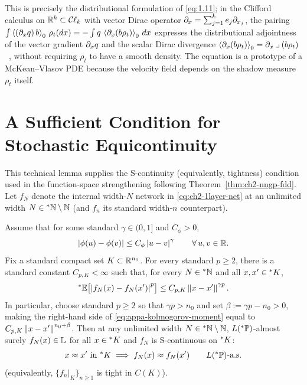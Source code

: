 This is precisely the distributional formulation of \eqref{eq:1.11}; in the Clifford calculus on $\mathbb{R}^k \subset \mathcal{C}\ell_k$ with vector Dirac operator $\partial_x = \sum_{j=1}^k e_j\partial_{x_j}$, the pairing $\int \left\langle (\partial_x q)\,b \right\rangle_0\,\rho_t(dx) = -\int q\,\left\langle \partial_x(b\rho_t) \right\rangle_0\,dx$ expresses the distributional adjointness of the vector gradient $\partial_x q$ and the scalar Dirac divergence $\left\langle \partial_x(b\rho_t) \right\rangle_0 = \partial_x \mathbin{\lrcorner} (b\rho_t)$~\cite{hestenes1984clifford,brackx1982clifford}, without requiring $\rho_t$ to have a smooth density. The equation is a prototype of a McKean--Vlasov PDE because the velocity field depends on the shadow measure $\rho_t$ itself.

\section{A Sufficient Condition for Stochastic Equicontinuity}
\label{sec:appa-equicontinuity}

This technical lemma supplies the S-continuity (equivalently, tightness) condition used in the function-space strengthening following Theorem~\ref{thm:ch2-nngp-fdd}.
Let $f_N$ denote the internal width-$N$ network in \eqref{eq:ch2-1layer-net} at an unlimited width $N \in {}^*\mathbb{N} \setminus \mathbb{N}$ (and $f_n$ its standard width-$n$ counterpart).

\begin{lemma}
\label{lem:holder-tightness}
Assume that for some standard $\gamma \in (0, 1]$ and $C_\phi > 0$,
\begin{equation}
\label{eq:appa-holder-act}
\left\lvert \phi(u) - \phi(v) \right\rvert \le C_\phi \left\lvert u - v \right\rvert^\gamma \qquad \forall\,u, v \in \mathbb{R}.
\end{equation}
Fix a standard compact set $K \subset \mathbb{R}^{n_0}$. For every standard $p \ge 2$, there is a standard constant $C_{p,K} < \infty$ such that, for every $N \in {}^*\mathbb{N}$ and all $x, x' \in {}^*K$,
\begin{equation}
\label{eq:appa-kolmogorov-moment}
{}^*\mathbb{E}\bigl[\left\lvert f_N(x) - f_N(x') \right\rvert^p\bigr] \le C_{p,K}\left\lVert x - x' \right\rVert^{\gamma p}.
\end{equation}
In particular, choose standard $p \ge 2$ so that $\gamma p > n_0$ and set $\beta := \gamma p - n_0 > 0$, making the right-hand side of \eqref{eq:appa-kolmogorov-moment} equal to $C_{p,K}\left\lVert x - x' \right\rVert^{n_0 + \beta}$. Then at any unlimited width $N \in {}^*\mathbb{N} \setminus \mathbb{N}$, $L({}^*\mathbb{P})$-almost surely $f_N(x) \in \mathbb{L}$ for all $x \in {}^*K$ and $f_N$ is S-continuous on ${}^*K$:
\[
x \approx x' \text{ in } {}^*K \implies f_N(x) \approx f_N(x') \qquad L({}^*\mathbb{P})\text{-a.s.}
\]
(equivalently, $\{f_n|_K\}_{n \ge 1}$ is tight in $C(K)$).
\end{lemma}

